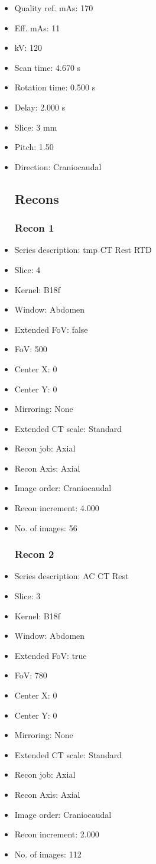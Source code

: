 \documentclass[12pt]{article}
\begin{document}
\begin{itemize}
\subsection{Scan}
\item Quality ref. mAs: 170\item Eff. mAs: 11\item kV: 120\item Scan time: 4.670 s\item Rotation time: 0.500 s\item Delay: 2.000 s\item Slice: 3 mm\item Pitch: 1.50\item Direction: Craniocaudal\subsection{Recons}

\subsubsection{Recon 1}
\item Series description: tmp CT Rest RTD
\item Slice: 4
\item Kernel: B18f
\item Window: Abdomen
\item Extended FoV: false
\item FoV: 500
\item Center X: 0
\item Center Y: 0
\item Mirroring: None
\item Extended CT scale: Standard
\item Recon job: Axial
\item Recon Axis: Axial
\item Image order: Craniocaudal
\item Recon increment: 4.000
\item No. of images: 56
\subsubsection{Recon 2}
\item Series description: AC CT Rest
\item Slice: 3
\item Kernel: B18f
\item Window: Abdomen
\item Extended FoV: true
\item FoV: 780
\item Center X: 0
\item Center Y: 0
\item Mirroring: None
\item Extended CT scale: Standard
\item Recon job: Axial
\item Recon Axis: Axial
\item Image order: Craniocaudal
\item Recon increment: 2.000
\item No. of images: 112

\end{itemize}
\end{document}

